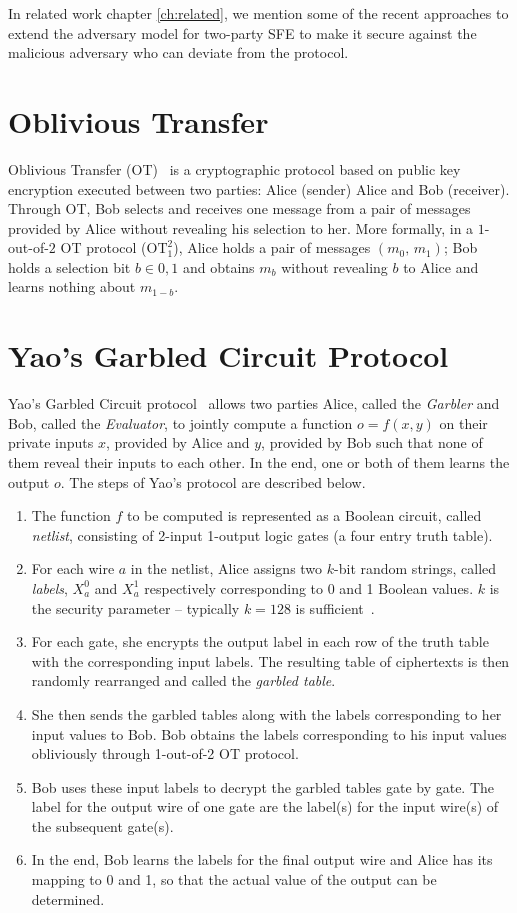 In related work chapter \ref{ch:related}, we mention some of the recent approaches to extend the adversary model for two-party SFE to make it secure against the malicious adversary who can deviate from the protocol.

\section{Oblivious Transfer}\label{sect:prelim-OT}
Oblivious Transfer (OT)~\cite{NaorP05} is a cryptographic protocol based on public key encryption executed between two parties: Alice (sender) Alice and Bob (receiver).
Through OT, Bob selects and receives one message from a pair of messages provided by Alice without revealing his selection to her.
More formally, in a $1$-out-of-$2$ OT protocol ($\textrm{OT}^2_1$), Alice holds a pair of messages $(m_{0},\, m_{1})$; Bob holds a selection bit $b \in {0,1}$ and obtains $m_{b}$ without revealing $b$ to Alice and learns nothing about $m_{1-b}$.

\section{Yao's Garbled Circuit Protocol}\label{sect:prelim_gc}
Yao's Garbled Circuit protocol~\cite{Yao86} allows two parties Alice, called the \textit{Garbler} and Bob, called the \textit{Evaluator}, to jointly compute a function $o = f(x, y)$ on their private inputs $x$, provided by Alice and $y$, provided by Bob such that none of them reveal their inputs to each other.
In the end, one or both of them learns the output $o$.
The steps of Yao's protocol are described below.

\begin{enumerate}[label=\roman*.]
\item The function $f$ to be computed is represented as a Boolean circuit, called \textit{netlist}, consisting of 2-input 1-output logic gates (a four entry truth table).
\item For each wire $a$ in the netlist, Alice assigns two $k$-bit random strings, called \textit{labels}, $X_a^{0}$ and $X_a^{1}$ respectively corresponding to 0 and 1 Boolean values.
      $k$ is the security parameter -- typically $k=128$ is sufficient~\cite{bellare2013efficient}.
\item For each gate, she encrypts the output label in each row of the truth table with the corresponding input labels.
      The resulting table of ciphertexts is then randomly rearranged and called the \textit{garbled table}.
\item She then sends the garbled tables along with the labels corresponding to her input values to Bob.
      Bob obtains the labels corresponding to his input values obliviously through 1-out-of-2 OT protocol.
\item Bob uses these input labels to decrypt the garbled tables gate by gate.
      The label for the output wire of one gate are the label(s) for the input wire(s) of the subsequent gate(s).
\item In the end, Bob learns the labels for the final output wire and Alice has its mapping to 0 and 1, so that the actual value of the output can be determined.
\end{enumerate}

